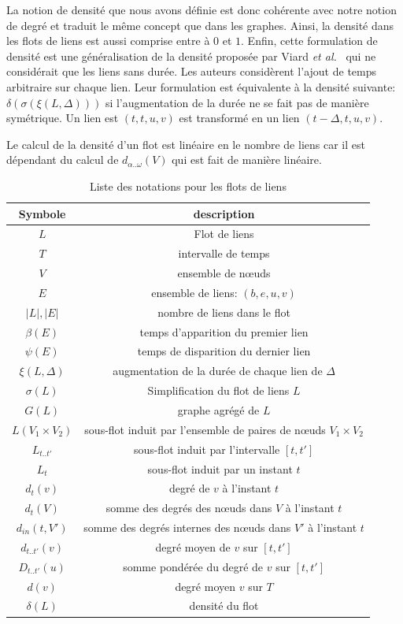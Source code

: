 La notion de densité que nous avons définie est donc cohérente avec notre notion de degré et traduit le même concept que dans les graphes.
Ainsi, la densité dans les flots de liens est aussi comprise entre à $0$ et $1$.
Enfin, cette formulation de densité est une généralisation de la densité proposée par Viard \emph{et al.}~\cite{Viard2014a} qui ne considérait que les liens sans durée.
Les auteurs considèrent l'ajout de temps arbitraire sur chaque lien.
Leur formulation est équivalente à la densité suivante: $\delta( \sigma(\xi(L,\Delta)))$ si l'augmentation de la durée ne se fait pas de manière symétrique.
Un lien est $(t,t,u,v)$ est transformé en un lien $(t-\Delta,t,u,v)$.

Le calcul de la densité d'un flot est linéaire en le nombre de liens car il est dépendant du calcul de $d_{\alpha..\omega}(V)$ qui est fait de manière linéaire.


\begin{table}
	\centering
	\begin{tabular}{|c|c|}
	\hline Symbole & description\\
	\hline $L$ & Flot de liens\\ 
	$T$ & intervalle de temps\\
	$V$ & ensemble de n\oe{}uds\\
	$E$ & ensemble de liens: $(b,e,u,v)$ \\
	$|L|,|E|$ & nombre de liens dans le flot\\
	$\beta(E)$ & temps d'apparition du premier lien\\
	$\psi(E)$ & temps de disparition du dernier lien\\
	$\xi(L,\Delta)$ & augmentation de la durée de chaque lien de $\Delta$\\
	$\sigma(L)$ & Simplification du flot de liens $L$\\
	$G(L)$ & graphe agrégé de $L$\\
	$L(V_1\times V_2)$ & sous-flot induit par l'ensemble de paires de n\oe{}uds $V_1\times V_2$ \\
	$L_{t..t'}$ & sous-flot induit par l'intervalle $[t,t']$ \\
	$L_{t}$ & sous-flot induit par un instant $t$\\
	$d_t(v)$ & degré de $v$ à l'instant $t$\\
	$d_t(V)$ & somme des degrés des n\oe{}uds dans $V$ à l'instant $t$\\
	$d_{in}(t,V')$ & somme des degrés internes des n\oe{}uds dans $V'$ à l'instant $t$\\
	$d_{t..t'}(v)$ & degré moyen de $v$ sur $[t,t']$\\
	$D_{t..t'}(u)$ & somme pondérée du degré de $v$ sur $[t,t']$\\
	$d(v)$ & degré moyen $v$ sur $T$\\
	$\delta(L)$ & densité du flot\\
	\hline
	\end{tabular} 
		\caption{Liste des notations pour les flots de liens}
\end{table}

